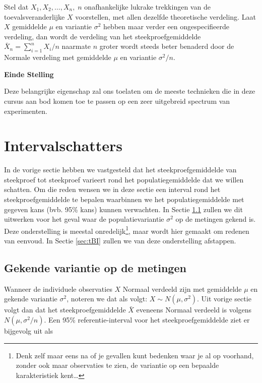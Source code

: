 \documentclass[
  12pt,dutch]{book}
\theoremstyle{definition}
\theoremstyle{definition}
\theoremstyle{definition}
\theoremstyle{definition}
\theoremstyle{remark}
\begin{document}
Stel dat \(X_1, X_2, \dots, X_n, \; n\) onafhankelijke lukrake trekkingen van
de toevalsveranderlijke \(X\) voorstellen, met allen dezelfde theoretische
verdeling. Laat \(X\) gemiddelde \(\mu\) en variantie \(\sigma^2\) hebben maar
verder een ongespecifieerde verdeling, dan wordt de verdeling van het
steekproefgemiddelde \(\bar{X}_n = {\sum_{i=1}^{n} X_i}/{n}\) naarmate \(n\)
groter wordt steeds beter benaderd door de Normale verdeling met gemiddelde \(\mu\) en variantie \(\sigma^2/n.\)

\textbf{Einde Stelling}

Deze belangrijke eigenschap zal ons toelaten om de meeste technieken die in deze cursus aan bod komen toe te passen op een zeer uitgebreid spectrum van experimenten.

\section{Intervalschatters}\label{intervalschatters}

In de vorige sectie hebben we vastgesteld dat het steekproefgemiddelde van
steekproef tot steekproef varieert rond het populatiegemiddelde dat we
willen schatten.
Om die reden wensen we in deze sectie een interval rond het
steekproefgemiddelde te bepalen waarbinnen we het populatiegemiddelde met
gegeven kans (bvb. 95\% kans) kunnen verwachten.
In Sectie \ref{subsec:bigek} zullen we dit uitwerken voor het geval waar de populatievariantie \(\sigma^2\)
op de metingen gekend is.
Deze onderstelling is meestal onredelijk\footnote{Denk zelf maar eens na of je gevallen kunt bedenken waar je al op voorhand,
  zonder ook maar observaties te zien, de variantie op een bepaalde
  karakteristiek kent\ldots{}}, maar wordt hier gemaakt om redenen van eenvoud.
In Sectie \ref{sec:tBI} zullen we van deze onderstelling afstappen.

\subsection{Gekende variantie op de metingen}\label{subsec:bigek}

Wanneer de individuele observaties \(X\) Normaal verdeeld zijn met gemiddelde \(\mu\) en gekende variantie \(\sigma^2\), noteren we dat als volgt: \(X\sim N(\mu,\sigma^2)\).
Uit vorige sectie volgt dan dat het steekproefgemiddelde \(\bar{X}\) eveneens Normaal verdeeld is volgens \(N(\mu,\sigma^2/n)\). Een 95\% referentie-interval voor het steekproefgemiddelde ziet er bijgevolg uit als
\end{document}

